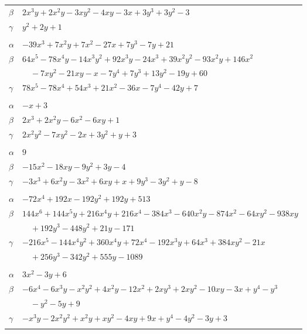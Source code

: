 \documentclass[11pt]{article}
\begin{document}
\begin{longtable}{@{}ll@{}}
$\beta$ & $2x^{3}y+2x^{2}y-3xy^{2}-4xy-3x+3y^{3}+3y^{2}-3$\\
$\gamma$ & $y^{2}+2y+1$\\
\addlinespace[3pt]
\multicolumn{2}{@{}l}{$\{i,j\}=\{9,10\}$, $k_{ij}=3^{2}\cdot 7$}\\
$\alpha$ & $-39x^{3}+7x^{2}y+7x^{2}-27x+7y^{3}-7y+21$\\
$\beta$ & $64x^{5}-78x^{4}y-14x^{3}y^{2}+92x^{3}y-24x^{3}+39x^{2}y^{2}-93x^{2}y+146x^{2}$\\
 & $\quad -7xy^{2}-21xy-x-7y^{4}+7y^{3}+13y^{2}-19y+60$\\
$\gamma$ & $78x^{5}-78x^{4}+54x^{3}+21x^{2}-36x-7y^{4}-42y+7$\\
\addlinespace[3pt]
\multicolumn{2}{@{}l}{$\{i,j\}=\{10,36\}$, $k_{ij}=3^{2}$}\\
$\alpha$ & $-x+3$\\
$\beta$ & $2x^{3}+2x^{2}y-6x^{2}-6xy+1$\\
$\gamma$ & $2x^{2}y^{2}-7xy^{2}-2x+3y^{2}+y+3$\\
\addlinespace[3pt]
\multicolumn{2}{@{}l}{$\{i,j\}=\{10,46\}$, $k_{ij}=5\cdot 7$}\\
$\alpha$ & $9$\\
$\beta$ & $-15x^{2}-18xy-9y^{2}+3y-4$\\
$\gamma$ & $-3x^{3}+6x^{2}y-3x^{2}+6xy+x+9y^{3}-3y^{2}+y-8$\\
\addlinespace[3pt]
\multicolumn{2}{@{}l}{$\{i,j\}=\{10,74\}$, $k_{ij}=3^{4}\cdot 19$}\\
$\alpha$ & $-72x^{4}+192x-192y^{2}+192y+513$\\
$\beta$ & $144x^{6}+144x^{5}y+216x^{4}y+216x^{4}-384x^{3}-640x^{2}y-874x^{2}-64xy^{2}-938xy$\\
 & $\quad +192y^{3}-448y^{2}+21y-171$\\
$\gamma$ & $-216x^{5}-144x^{4}y^{2}+360x^{4}y+72x^{4}-192x^{3}y+64x^{3}+384xy^{2}-21x$\\
 & $\quad +256y^{3}-342y^{2}+555y-1089$\\
\addlinespace[3pt]
\multicolumn{2}{@{}l}{$\{i,j\}=\{10,96\}$, $k_{ij}=2\cdot 3^{2}$}\\
$\alpha$ & $3x^{2}-3y+6$\\
$\beta$ & $-6x^{4}-6x^{3}y-x^{2}y^{2}+4x^{2}y-12x^{2}+2xy^{3}+2xy^{2}-10xy-3x+y^{4}-y^{3}$\\
 & $\quad -y^{2}-5y+9$\\
$\gamma$ & $-x^{3}y-2x^{2}y^{2}+x^{2}y+xy^{2}-4xy+9x+y^{4}-4y^{2}-3y+3$\\
\addlinespace[3pt]

\end{longtable}
\end{document}
